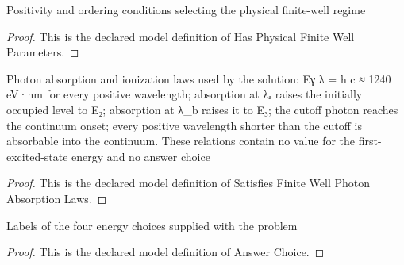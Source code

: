 \begin{definition}
  \label{def:physics:phyx-mini-0586:phyxminiproblems-problemphyxmini0586-hasphysicalfinitewellparameters}
  Positivity and ordering conditions selecting the physical finite-well regime
\end{definition}
\begin{proof}
  This is the declared model definition of Has Physical Finite Well Parameters.
\end{proof}
\begin{definition}
  \label{def:physics:phyx-mini-0586:phyxminiproblems-problemphyxmini0586-satisfiesfinitewellphotonabsorptionlaws}
  Photon absorption and ionization laws used by the solution: Eγ λ = h c ≈ 1240 eV·nm for every positive wavelength; absorption at λₐ raises the initially occupied level to E₂; absorption at λ\_b raises it to E₃; the cutoff photon reaches the continuum onset; every positive wavelength shorter than the cutoff is absorbable into the continuum. These relations contain no value for the first-excited-state energy and no answer choice
\end{definition}
\begin{proof}
  This is the declared model definition of Satisfies Finite Well Photon Absorption Laws.
\end{proof}
\begin{definition}
  \label{def:physics:phyx-mini-0586:phyxminiproblems-problemphyxmini0586-answerchoice}
  Labels of the four energy choices supplied with the problem
\end{definition}
\begin{proof}
  This is the declared model definition of Answer Choice.
\end{proof}
